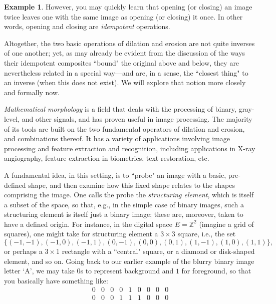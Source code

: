 \documentclass[11pt]{book}
\theoremstyle{definition}
\newtheorem{example}{Example}[section]
\theoremstyle{definition}
\theoremstyle{definition}
\theoremstyle{theorem}
\theoremstyle{definition}
\begin{document}
\begin{example}
	However, you may quickly learn that opening (or closing) an image twice leaves one with the same image as opening (or closing) it once. In other words, opening and closing are \textit{idempotent} operations. \par 
	Altogether, the two basic operations of dilation and erosion are not quite inverses of one another; yet, as may already be evident from the discussion of the ways their idempotent composites ``bound" the original above and below, they are nevertheless related in a special way---and are, in a sense, the ``closest thing" to an inverse (when this does not exist). We will explore that notion more closely and formally now.\par 
	\textit{Mathematical morphology}  is a field that deals with the processing of binary, gray-level, and other signals, and has proven useful in image processing. The majority of its tools are built on the two fundamental operators of dilation and erosion, and combinations thereof. It has a variety of applications involving image processing and feature extraction and recognition, including applications in X-ray angiography, feature extraction in biometrics, text restoration, etc.\par 
	A fundamental idea, in this setting, is to ``probe" an image with a basic, pre-defined shape, and then examine how this fixed shape relates to the shapes comprising the image. One calls the probe the \textit{structuring element}, which is itself a subset of the space, so that, e.g., in the simple case of binary images, such a structuring element is itself just a binary image; these are, moreover, taken to have a defined origin. For instance, in the digital space $E = \mathbb{Z}^2$ (imagine a grid of squares), one might take for structuring element a $3 \times 3$ square, i.e., the set 
	\begin{equation*} 
	\{(-1,-1), (-1,0), (-1,1), (0,-1), (0,0), (0,1), (1,-1), (1,0), (1,1) \},
	\end{equation*} or perhaps a $3 \times 1$ rectangle with a ``central" square, or a diamond or disk-shaped element, and so on. Going back to our earlier example of the blurry binary image letter `A', we may take $0$s to represent background and $1$ for foreground, so that you basically have something like: 
	\begin{equation*} 
	\begin{smallmatrix}
	0 & 0 & 0 & 0 & 1 & 0 & 0 & 0 & 0\\
	0 & 0 & 0 & 1 & 1 & 1 & 0 & 0 & 0\\ 

\end{smallmatrix}
\end{equation*}
\end{example}
\end{document}
